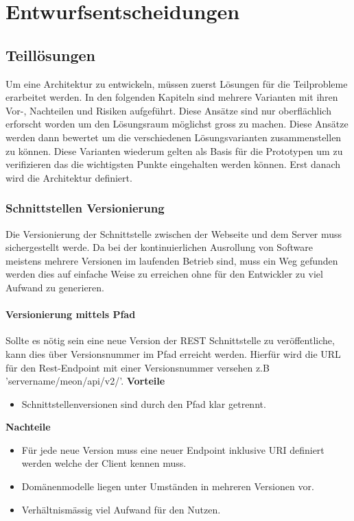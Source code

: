 
\chapter{Entwurfsentscheidungen}
\label{entwurfsentscheidungen}
\section{Teillösungen}

Um eine Architektur zu entwickeln, müssen zuerst Lösungen für die Teilprobleme erarbeitet werden. In den folgenden Kapiteln sind mehrere Varianten mit ihren Vor-, Nachteilen und Risiken aufgeführt. Diese Ansätze sind nur oberflächlich erforscht worden um den Lösungsraum möglichst gross zu machen. Diese Ansätze werden dann bewertet um die verschiedenen Lösungsvarianten zusammenstellen zu können. Diese Varianten wiederum gelten als Basis für die Prototypen um zu verifizieren das die wichtigsten Punkte eingehalten werden können. Erst danach wird die Architektur definiert.

\subsection{Schnittstellen Versionierung}

Die Versionierung der Schnittstelle zwischen der Webseite und dem Server muss sichergestellt werde. Da bei der kontinuierlichen Ausrollung von Software meistens mehrere Versionen im laufenden Betrieb sind, muss ein Weg gefunden werden dies auf einfache Weise zu erreichen ohne für den Entwickler zu viel Aufwand zu generieren.

\subsubsection{Versionierung mittels Pfad}

Sollte es nötig sein eine neue Version der \Gls{REST} Schnittstelle zu veröffentliche, kann dies über Versionsnummer im Pfad erreicht werden. Hierfür wird die URL für den Rest-Endpoint mit einer Versionsnummer versehen z.B 'servername/meon/api/v2/'.
\newline
\newline
\textbf{Vorteile}
\begin{itemize}
	\item Schnittstellenversionen sind durch den Pfad klar getrennt.
\end{itemize}
\textbf{Nachteile}
\begin{itemize}
	\item Für jede neue Version muss eine neuer Endpoint inklusive URI definiert werden welche der Client kennen muss.
	\item Domänenmodelle liegen unter Umständen in mehreren Versionen vor.
	\item Verhältnismässig viel Aufwand für den Nutzen.
\end{itemize}

